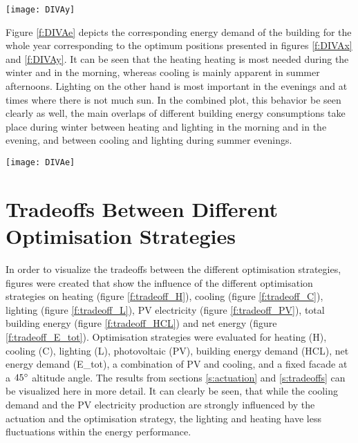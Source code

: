 	\begin{figure*}
		\begin{center}
		\texttt{[image: DIVAy]}
		\caption{Carpet plots detailing the optimal azimuth angles to minimise the (a) heating demand, (b) cooling demand, (c) lighting demand, and (d) total building energy demand. Cooling is minimized by bocking the sun, whereas lighting and heating is minimized by opening the facade to let the insolation in.}
		\label{f:DIVAy}
		\end{center}
	\end{figure*}

	Figure \ref{f:DIVAe} depicts the corresponding energy demand of the building for the whole year corresponding to the optimum positions presented in figures \ref{f:DIVAx} and \ref{f:DIVAy}. It can be seen that the heating heating is most needed during the winter and in the morning, whereas cooling is mainly apparent in summer afternoons. Lighting on the other hand is most important in the evenings and at times where there is not much sun. In the combined plot, this behavior be seen clearly as well, the main overlaps of different building energy consumptions take place during winter between heating and lighting in the morning and in the evening, and between cooling and lighting during summer evenings. 

	\begin{figure*}
		\begin{center}
		\texttt{[image: DIVAe]}
		\caption{Carpet plots detailing the net energy consumption. Each square represents the total energy consumption for that specific hour of the entire month. Red colours detail the energy demand, while blue colours detail the energy supply.}
		\label{f:DIVAe}
		\end{center}
	\end{figure*}
	
\section{Tradeoffs Between Different Optimisation Strategies}
\label{a:tradeoffs}
	
	In order to visualize the tradeoffs between the different optimisation strategies, figures were created that show the influence of the different optimisation strategies on heating (figure \ref{f:tradeoff_H}), cooling (figure \ref{f:tradeoff_C}), lighting (figure \ref{f:tradeoff_L}), PV electricity (figure \ref{f:tradeoff_PV}), total building energy (figure \ref{f:tradeoff_HCL}) and net energy (figure \ref{f:tradeoff_E_tot}). Optimisation strategies were evaluated for heating (H), cooling (C), lighting (L), photovoltaic (PV), building energy demand (HCL), net energy demand (E\_tot), a combination of PV and cooling, and a fixed facade at a $45\degree$ altitude angle. The results from sections \ref{s:actuation} and \ref{s:tradeoffs} can be visualized here in more detail. It can clearly be seen, that while the cooling demand and the PV electricity production are strongly influenced by the actuation and the optimisation strategy, the lighting and heating have less fluctuations within the energy performance. 

